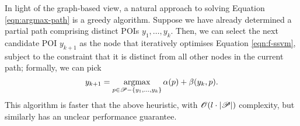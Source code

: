 
In light of the graph-based view, a natural approach to solving Equation \ref{eqn:argmax-path} is a greedy algorithm.
Suppose we have already determined a partial path comprising distinct POIs $y_1, \ldots, y_k$.
Then, we can select the next candidate POI $y_{k + 1}$ as
the node
that iteratively optimises Equation \ref{eqn:f-ssvm},
subject to the constraint that it is distinct from all other nodes in the current path;
formally, we can pick
$$ y_{k + 1} = \operatorname*{argmax}_{p \in \mathscr{P} - \{ y_1, \ldots, y_k \}} \alpha( p ) + \beta( y_k, p ). $$
This algorithm is faster that the above heuristic, with $\mathscr{O}(l \cdot | \mathscr{P} |)$ complexity,
but similarly has an unclear performance guarantee.
